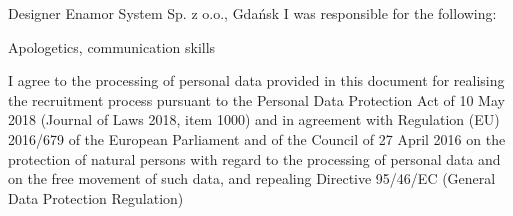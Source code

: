 \documentclass{cvClass} %
\begin{document}
   {
      \experience
        {Designer}
        {Enamor System Sp. z o.o., Gdańsk}
        {I was responsible for the following:} {
        }
    }

  
   {Apologetics, communication skills}

  \vfill
    {I agree to the processing of personal data provided in this document for realising the recruitment process pursuant to the Personal Data Protection Act of 10 May 2018 (Journal of Laws 2018, item 1000) and in agreement with Regulation (EU) 2016/679 of the European Parliament and of the Council of 27 April 2016 on the protection of natural persons with regard to the processing of personal data and on the free movement of such data, and repealing Directive 95/46/EC (General Data Protection Regulation)}
\end{document}
